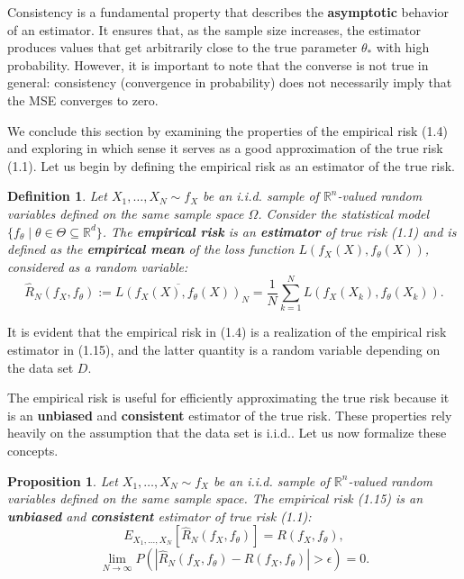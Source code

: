 \documentclass{report}
\newtheorem{definition}{Definition}[chapter]
\newtheorem{proposition}{Proposition}[chapter]
\begin{document}
Consistency is a fundamental property that describes the \textbf{asymptotic} behavior of an estimator. It ensures that, as the sample size increases, the estimator produces values that get arbitrarily close to the true parameter $\theta_*$ with high probability. However, it is important to note that the converse is not true in general: consistency (convergence in probability) does not necessarily imply that the MSE converges to zero.

We conclude this section by examining the properties of the empirical risk (1.4) and exploring in which sense it serves as a good approximation of the true risk (1.1). Let us begin by defining the empirical risk as an estimator of the true risk.

\begin{definition}
Let $X_1,\dots,X_N \sim f_X$ be an i.i.d. sample of $\mathbb{R}^n$-valued random variables defined on the same sample space $\Omega$. Consider the statistical model $\{f_\theta \mid \theta \in \Theta \subseteq \mathbb{R}^d\}$. The \textbf{empirical risk} is an \textbf{estimator} of true risk (1.1) and is defined as the \textbf{empirical mean} of the loss function $L(f_X(X), f_\theta(X))$, considered as a random variable:
\begin{equation}
\hat{R}_N(f_X,f_\theta) := \overline{L(f_X(X),f_\theta(X))}_N = \frac{1}{N}\sum_{k=1}^{N}L(f_X(X_k),f_\theta(X_k)).
\end{equation}
\end{definition}

It is evident that the empirical risk in (1.4) is a realization of the empirical risk estimator in (1.15), and the latter quantity is a random variable depending on the data set $D$.

The empirical risk is useful for efficiently approximating the true risk because it is an \textbf{unbiased} and \textbf{consistent} estimator of the true risk. These properties rely heavily on the assumption that the data set is i.i.d.. Let us now formalize these concepts.

\begin{proposition}
Let $X_1,\dots,X_N \sim f_X$ be an i.i.d. sample of $\mathbb{R}^n$-valued random variables defined on the same sample space. The empirical risk (1.15) is an \textbf{unbiased} and \textbf{consistent} estimator of true risk (1.1):
\begin{equation}
 E_{X_1,...,X_N}[\hat{R}_N(f_X,f_\theta)] = R(f_X,f_\theta),
\end{equation}
\begin{equation}
\lim_{N\to \infty}P(|\hat{R}_N(f_X,f_\theta)-R(f_X,f_\theta)| > \epsilon) = 0.
\end{equation}
\end{proposition}
\end{document}
